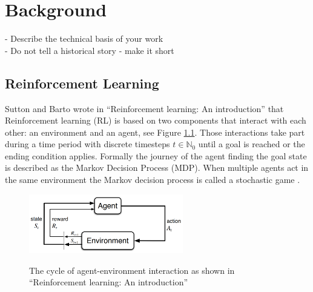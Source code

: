 \chapter{Background}\label{sec:Background}
- Describe the technical basis of your work \\
- Do not tell a historical story - make it short

\section{Reinforcement Learning}\label{reinforcement_learning}
Sutton and Barto wrote in ``Reinforcement learning: An introduction''\cite{suba18} that Reinforcement learning (RL) is based on two components that interact with each other: an environment and an agent, see Figure \ref{fig:rl_cycle}. Those interactions take part during a time period with discrete timesteps $t\in\mathbb{N}_0$ until a goal is reached or the ending condition applies. Formally the journey of the agent finding the goal state is described as the Markov Decision Process (MDP).
When multiple agents act in the same environment the Markov decision process is called a stochastic game \cite{buba10}.
\begin{figure}[hpbt]
    \centering
    \includegraphics[width=0.6\textwidth]{pictures/RLInteractionSB}\\
    \caption[Reinforcement Learning Cycle]{The cycle of agent-environment interaction as
        shown in ``Reinforcement learning: An introduction''\cite{suba18}}\label{fig:rl_cycle}
\end{figure}

